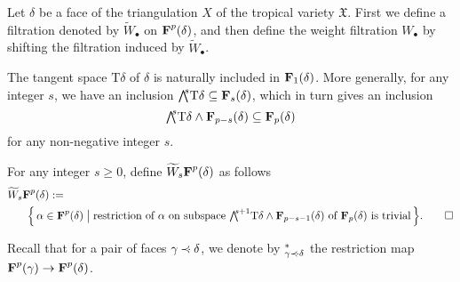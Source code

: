 \documentclass[11pt]{amsart}
\theoremstyle{definition}
\newenvironment{defi}
  {\pushQED{\qed}\renewcommand{\qedsymbol}{$\diamond$}\defii}
  {\popQED\enddefii}
\numberwithin{equation}{section}
\renewcommand{\~}{\widetilde}
\newcommand{\bul}{\bullet} %
\let\oldbigwedge\bigwedge
\renewcommand{\bigwedge}{{\textstyle\oldbigwedge\!}}
\newcommand{\TT}{\mathrm{T}} %
\let\i\relax
\newcommand{\i}{{\mathop{}\mathrm{i}}} %
\newcommand{\SF}{\textrm{\bf F}} %
\newcommand{\st}{\bigm|} %
\newcommand{\X}{\mathfrak X}
\newcommand{\subface}{\prec}
\newcommand{\ssubface}{\mathbin{\mathchoice
  {\subface\!\!\!\cdot}%
  {\subface\!\!\!\cdot}%
  {\subface\!\cdot}%
  {\subface\!\cdot}%
}} %
\begin{document}
\medskip

Let $\delta$ be a face of the triangulation $X$ of the tropical variety $\X$. First we define a filtration denoted by $\~ W_\bul$ on $\SF^p(\delta)$, and then define the weight filtration $W_\bul$ by shifting the filtration induced by $\~ W_\bul$.

\medskip

The tangent space $\TT\delta$ of $\delta$ is naturally included in $\SF_1(\delta)$. More generally, for any integer $s$, we have an inclusion $\bigwedge^s\TT\delta \subseteq \SF_s(\delta)$, which in turn gives an inclusion
\[\bigwedge^s\TT\delta  \wedge \SF_{p-s}(\delta) \subseteq \SF_p(\delta)
\]
for any non-negative integer $s$.

\begin{defi} For any integer $s\geq 0$, define $\~ W_s \SF^p(\delta)$ as follows
\begin{align*}
\~W_s \SF^p(\delta) &:= \\
  & \hspace{-2em}\Bigl\{ \, \alpha \in \SF^p(\delta) \st \textrm{restriction of $\alpha$ on subspace } \bigwedge^{s+1}\TT\delta  \wedge \SF_{p-s-1}(\delta) \textrm{ of } \SF_p(\delta) \textrm{ is trivial}\, \Bigr\}. \qedhere
\end{align*}
\end{defi}

Recall that for a pair of faces $\gamma \ssubface \delta$, we denote by $\i^*_{\gamma\ssubface\delta}$ the restriction map $\SF^p(\gamma) \to \SF^p(\delta)$.
\end{document}
